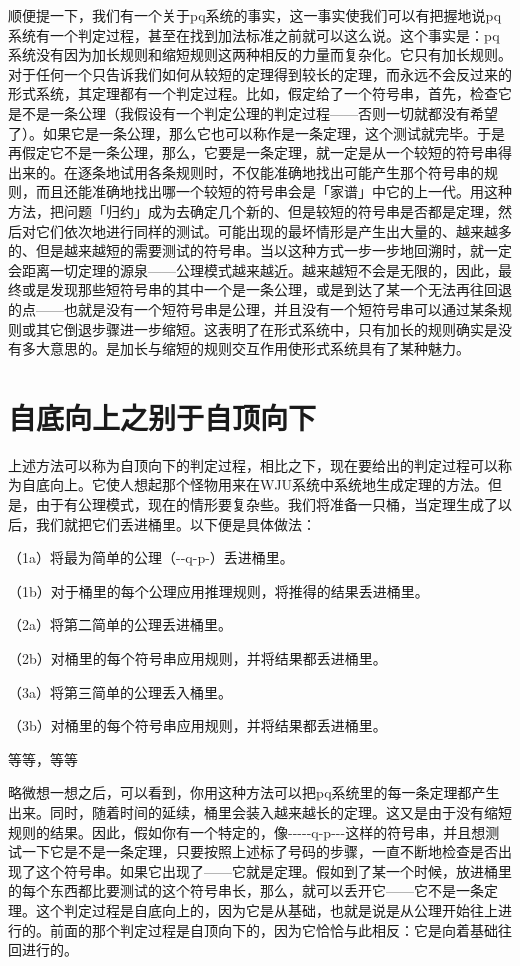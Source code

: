\documentclass[
  12pt,
  twoside,
  openright,
  oldfontcommands,
]{memoir}
\begin{document}
顺便提一下，我们有一个关于pq系统的事实，这一事实使我们可以有把握地说pq系统有一个判定过程，甚至在找到加法标准之前就可以这么说。这个事实是：pq系统没有因为加长规则和缩短规则这两种相反的力量而复杂化。它只有加长规则。对于任何一个只告诉我们如何从较短的定理得到较长的定理，而永远不会反过来的形式系统，其定理都有一个判定过程。比如，假定给了一个符号串，首先，检查它是不是一条公理（我假设有一个判定公理的判定过程------否则一切就都没有希望了）。如果它是一条公理，那么它也可以称作是一条定理，这个测试就完毕。于是再假定它不是一条公理，那么，它要是一条定理，就一定是从一个较短的符号串得出来的。在逐条地试用各条规则时，不仅能准确地找出可能产生那个符号串的规则，而且还能准确地找出哪一个较短的符号串会是「家谱」中它的上一代。用这种方法，把问题「归约」成为去确定几个新的、但是较短的符号串是否都是定理，然后对它们依次地进行同样的测试。可能出现的最坏情形是产生出大量的、越来越多的、但是越来越短的需要测试的符号串。当以这种方式一步一步地回溯时，就一定会距离一切定理的源泉------公理模式越来越近。越来越短不会是无限的，因此，最终或是发现那些短符号串的其中一个是一条公理，或是到达了某一个无法再往回退的点------也就是没有一个短符号串是公理，并且没有一个短符号串可以通过某条规则或其它倒退步骤进一步缩短。这表明了在形式系统中，只有加长的规则确实是没有多大意思的。是加长与缩短的规则交互作用使形式系统具有了某种魅力。

\section{自底向上之别于自顶向下}

上述方法可以称为自顶向下的判定过程，相比之下，现在要给出的判定过程可以称为自底向上。它使人想起那个怪物用来在WJU系统中系统地生成定理的方法。但是，由于有公理模式，现在的情形要复杂些。我们将准备一只桶，当定理生成了以后，我们就把它们丢进桶里。以下便是具体做法：

（1a）将最为简单的公理（-\/-q-p-）丢进桶里。

（1b）对于桶里的每个公理应用推理规则，将推得的结果丢进桶里。

（2a）将第二简单的公理丢进桶里。

（2b）对桶里的每个符号串应用规则，并将结果都丢进桶里。

（3a）将第三简单的公理丢入桶里。

（3b）对桶里的每个符号串应用规则，并将结果都丢进桶里。

等等，等等

略微想一想之后，可以看到，你用这种方法可以把pq系统里的每一条定理都产生出来。同时，随着时间的延续，桶里会装入越来越长的定理。这又是由于没有缩短规则的结果。因此，假如你有一个特定的，像-\/-\/-\/-\/-q-p-\/-\/-这样的符号串，并且想测试一下它是不是一条定理，只要按照上述标了号码的步骤，一直不断地检查是否出现了这个符号串。如果它出现了------它就是定理。假如到了某一个时候，放进桶里的每个东西都比要测试的这个符号串长，那么，就可以丢开它------它不是一条定理。这个判定过程是自底向上的，因为它是从基础，也就是说是从公理开始往上进行的。前面的那个判定过程是自顶向下的，因为它恰恰与此相反：它是向着基础往回进行的。
\end{document}
